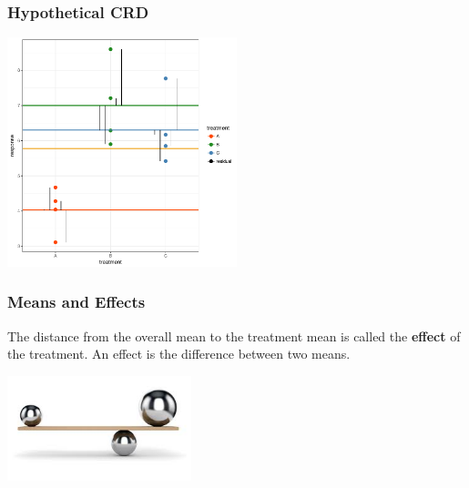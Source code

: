 \begin{frame}\frametitle{Hypothetical CRD}
\centering
\includegraphics[width=0.5\textwidth]{hypcrd_trtss.pdf}
\end{frame}


\begin{frame}\frametitle{Means and Effects}

The distance from the overall mean to the treatment mean is called the \textbf{effect} of the treatment. An
effect is the difference between two means.
\vspace{1cm}


\begin{center}
\includegraphics[width=0.4\textwidth]{effects.jpg}
\end{center}
\end{frame}


